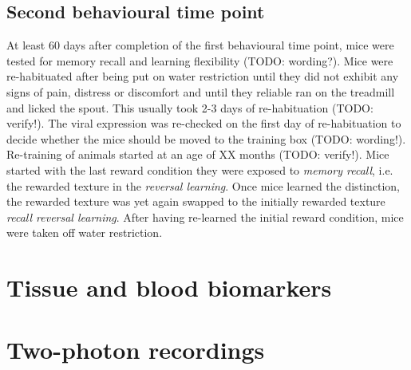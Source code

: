\subsection{Second behavioural time point}
At least 60 days after completion of the first behavioural time point, mice were tested for memory recall and learning flexibility (TODO: wording?).
Mice were re-habituated after being put on water restriction until they did not exhibit any signs of pain, distress or discomfort and until they reliable ran on the treadmill and licked the spout. This usually took 2-3 days of re-habituation (TODO: verify!). The viral expression was re-checked on the first day of re-habituation to decide whether the mice should be moved to the training box (TODO: wording!).
Re-training of animals started at an age of XX months (TODO: verify!). Mice started with the last reward condition they were exposed to \textit{memory recall}, i.e. the rewarded texture in the \textit{reversal learning}. Once mice learned the distinction, the rewarded texture was yet again swapped to the initially rewarded texture \textit{recall reversal learning}. After having re-learned the initial reward condition, mice were taken off water restriction.

\section{Tissue and blood biomarkers}

\section{Two-photon recordings}
